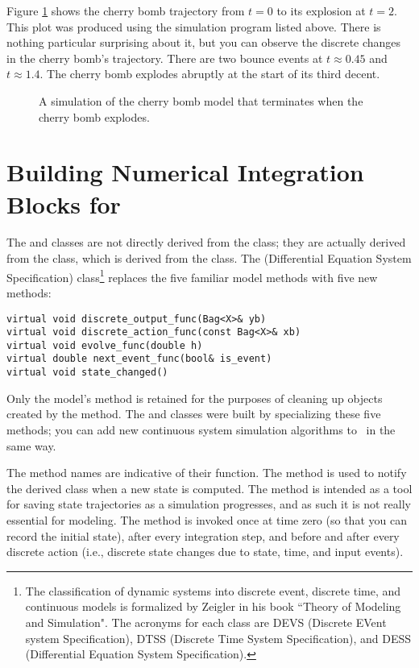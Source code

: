 Figure \ref{fig:cherry_bomb_trajectory} shows the cherry bomb trajectory from $t=0$ to its explosion at $t=2$. This plot was produced using the simulation program listed above. There is nothing particular surprising about it, but you can observe the discrete changes in the cherry bomb's trajectory. There are two bounce events at $t \approx 0.45$ and $t \approx 1.4$. The cherry bomb explodes abruptly at the start of its third decent.
\begin{figure}[ht]
\centering
{}
\caption{A simulation of the cherry bomb model that terminates when the cherry bomb explodes.}
\label{fig:cherry_bomb_trajectory}
\end{figure}

\section{Building Numerical Integration Blocks for \adevs}
The  and  classes are not directly derived from the  class; they are actually derived from the  class, which is derived from the  class. The  (Differential Equation System Specification) class\footnote{The classification of dynamic systems into discrete event, discrete time, and continuous models is formalized by Zeigler in his book ``Theory of Modeling and Simulation". The acronyms for each class are DEVS (Discrete EVent system Specification), DTSS (Discrete Time System Specification), and DESS (Differential Equation System Specification).} replaces the five familiar  model methods with five new methods: 
\begin{verbatim}
virtual void discrete_output_func(Bag<X>& yb)
virtual void discrete_action_func(const Bag<X>& xb)
virtual void evolve_func(double h)
virtual double next_event_func(bool& is_event)
virtual void state_changed()
\end{verbatim}
Only the  model's  method is retained for the purposes of cleaning up objects created by the  method. The  and  classes were built by specializing these five methods; you can add new continuous system simulation algorithms to \adevs\ in the same way.

The method names are indicative of their function. The  method is used to notify the derived class when a new state is computed. The method is intended as a tool for saving state trajectories as a simulation progresses, and as such it is not really essential for modeling. The  method is invoked once at time zero (so that you can record the initial state), after every integration step, and before and after every discrete action (i.e., discrete state changes due to state, time, and input events).

